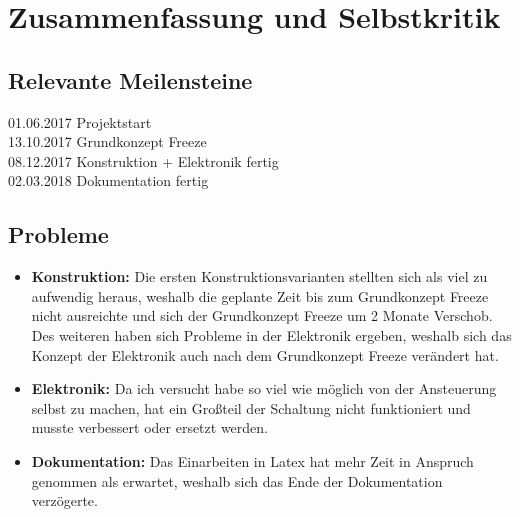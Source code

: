 \newpage
\section{Zusammenfassung und Selbstkritik}
\subsection{Relevante Meilensteine}
01.06.2017 Projektstart \\

13.10.2017 Grundkonzept Freeze\\

08.12.2017 Konstruktion + Elektronik fertig\\

02.03.2018 Dokumentation fertig\\ 
\subsection{Probleme}
\begin{itemize}
\item \textbf{Konstruktion:} Die ersten Konstruktionsvarianten stellten sich als viel zu aufwendig heraus, weshalb die geplante Zeit bis zum Grundkonzept Freeze nicht ausreichte und sich der Grundkonzept Freeze um 2 Monate Verschob. Des weiteren haben sich Probleme in der Elektronik ergeben, weshalb sich das Konzept der Elektronik auch nach dem Grundkonzept Freeze verändert hat.
\item \textbf{Elektronik:} Da ich versucht habe so viel wie möglich von der Ansteuerung selbst zu machen, hat ein Großteil der Schaltung nicht funktioniert und musste verbessert oder ersetzt werden. 
\item \textbf{Dokumentation:} Das Einarbeiten in Latex hat mehr Zeit in Anspruch genommen als erwartet, weshalb sich das Ende der Dokumentation verzögerte.
\end{itemize}
